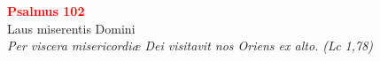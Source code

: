 


\def\greinitialformat#1{%
{\fontsize{39}{39}\selectfont #1}%
}




\vspace{0.3cm}
\begin{center}
 \textcolor{red}{\large \bf Psalmus 102}\\
Laus miserentis Domini\\
\textit{\small Per viscera misericordiæ Dei visitavit nos Oriens ex alto. (Lc 1,78)}
\end{center}
